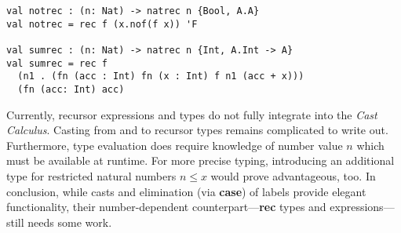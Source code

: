 \begin{lstlisting}[float, language=ldgv,
	caption=LDGV: Example usage of \rec expression and type,
	label=lst:rec-ldgv-example]
val notrec : (n: Nat) -> natrec n {Bool, A.A}
val notrec = rec f (x.nof(f x)) 'F

val sumrec : (n: Nat) -> natrec n {Int, A.Int -> A}
val sumrec = rec f
  (n1 . (fn (acc : Int) fn (x : Int) f n1 (acc + x)))
  (fn (acc: Int) acc)
\end{lstlisting}

Currently, recursor expressions and types do not fully integrate into the \emph{Cast Calculus}. Casting from and to recursor types remains complicated to write out. Furthermore, type evaluation does require knowledge of number value $n$ which must be available at runtime. For more precise typing, introducing an additional type for restricted natural numbers $n \leq x$ would prove advantageous, too. In conclusion, while casts and elimination (via \textbf{case}) of labels provide elegant functionality, their number-dependent counterpart---\textbf{rec} types and expressions---still needs some work.